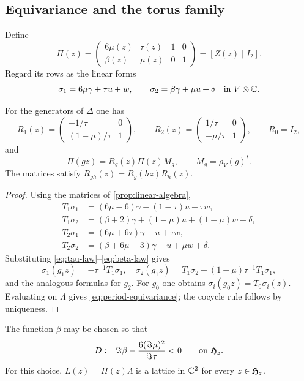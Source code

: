 \subsection{Equivariance and the torus family}
Define
\[
 \Pi(z)=
 \begin{pmatrix}
 6\mu(z)&\tau(z)&1&0\\
 \beta(z)&\mu(z)&0&1
 \end{pmatrix}
 =[Z(z)\mid I_2].
\]
Regard its rows as the linear forms
\[
 \sigma_1=6\mu\gamma+\tau u+w,
 \qquad
 \sigma_2=\beta\gamma+\mu u+\delta
 \quad\text{in }V\otimes\mathbb C.
\]

\begin{proposition}[Equivariance]\label{prop:period-equivariance}
For the generators of $\Delta$ one has
\[
 R_1(z)=
 \begin{pmatrix}
 -1/\tau&0\\
 (1-\mu)/\tau&1
 \end{pmatrix},
 \qquad
 R_2(z)=
 \begin{pmatrix}
 1/\tau&0\\
 -\mu/\tau&1
 \end{pmatrix},
 \qquad R_0=I_2,
\]
and
\begin{equation}\label{eq:period-equivariance}
 \Pi(gz)=R_g(z)\Pi(z)M_g,
 \qquad M_g=\rho_V(g)^t.
\end{equation}
The matrices satisfy $R_{gh}(z)=R_g(hz)R_h(z)$.
\end{proposition}

\begin{proof}
Using the matrices of \cref{prop:linear-algebra},
\[
\begin{aligned}
T_1\sigma_1&=(6\mu-6)\gamma+(1-\tau)u-\tau w,\\
T_1\sigma_2&=(\beta+2)\gamma+(1-\mu)u+(1-\mu)w+\delta,\\
T_2\sigma_1&=(6\mu+6\tau)\gamma-u+\tau w,\\
T_2\sigma_2&=(\beta+6\mu-3)\gamma+u+\mu w+\delta.
\end{aligned}
\]
Substituting \eqref{eq:tau-law}--\eqref{eq:beta-law} gives
\[
 \sigma_1(g_1z)=-\tau^{-1}T_1\sigma_1,
 \quad
 \sigma_2(g_1z)=T_1\sigma_2+(1-\mu)\tau^{-1}T_1\sigma_1,
\]
and the analogous formulas for $g_2$.  For $g_0$ one obtains
$\sigma_i(g_0z)=T_0\sigma_i(z)$.  Evaluating on $\Lambda$ gives
\eqref{eq:period-equivariance}; the cocycle rule follows by uniqueness.
\end{proof}

\begin{corollary}
\label{cor:nondegenerate-periods}
The function $\beta$ may be chosen so that
\begin{equation}\label{eq:D-negative}
 D:=\Im\beta-\frac{6(\Im\mu)^2}{\Im\tau}<0
 \qquad\text{on }\mathfrak H_z.
\end{equation}
For this choice, $L(z)=\Pi(z)\Lambda$ is a lattice in $\mathbb C^2$ for every
$z\in\mathfrak H_z$.
\end{corollary}

